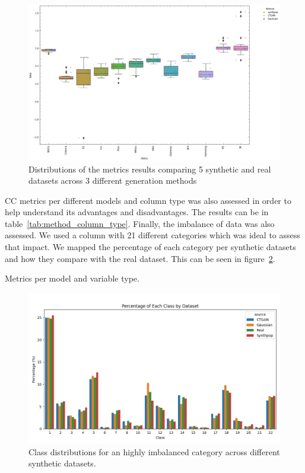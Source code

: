     
\begin{figure}[htbp]
\centering
\caption{Distributions of the metrics results comparing 5 synthetic and real datasets across 3 different generation methods}\label{fig:synth_result} 
\includegraphics[scale=0.55]{figures/synthetic_violin_swarm_colored_by_group_custom.png}
\end{figure}

CC metrics per different models and column type was also assessed in order to help understand its advantages and disadvantages. The results can be in table~\ref{tab:method_column_type}. Finally, the imbalance of data was also assessed. We used a column with 21 different categories which was ideal to assess that impact. We mapped the percentage of each category per synthetic datasets and how they compare with the real dataset. This can be seen in figure~\ref{fig:imbalance}.
\begin{table}[h!]
    \caption{Metrics per model and variable type.}\label{tab:method_column_type}

\end{table}


\begin{figure}[htbp]
    \centering
    \caption{Class distributions for an highly imbalanced category across different synthetic datasets.}\label{fig:imbalance} 
    \includegraphics[scale=0.55]{figures/imbalance.png}
    \end{figure}


